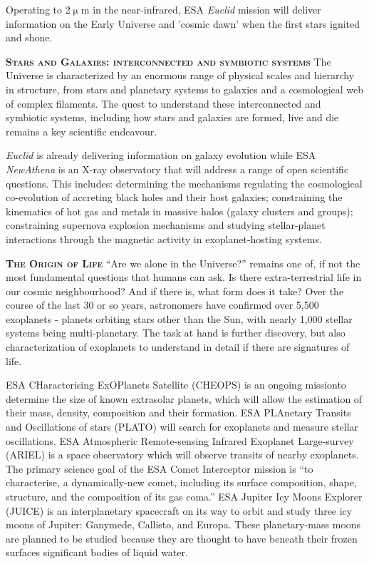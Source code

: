 \documentclass[a4paper,12pt]{texMemo}
\begin{document}
\smallskip
\smallskip
Operating to 2$\upmu$m in the near-infrared, ESA \textit{Euclid}
mission will deliver information on the Early Universe and 'cosmic
dawn' when the first stars ignited and shone.


\smallskip
\smallskip
\noindent
{\bfseries \textsc{\textcolor{Cerulean}{Stars and Galaxies: interconnected and symbiotic systems}}}
The Universe is characterized by an enormous range of physical scales and hierarchy in structure, from
stars and planetary systems to galaxies and a cosmological web of complex filaments.
The quest to understand these interconnected and symbiotic systems, including
how stars and galaxies are formed, live and die remains a key scientific endeavour. 

\smallskip
\textit{Euclid} is already delivering information on galaxy evolution
while ESA \textit{NewAthena} is an X-ray observatory that will address
a range of open scientific questions.  This includes: determining the
mechanisms regulating the cosmological co-evolution of accreting black
holes and their host galaxies; constraining the kinematics of hot gas
and metals in massive halos (galaxy clusters and groups); constraining
supernova explosion mechanisms and studying stellar-planet
interactions through the magnetic activity in exoplanet-hosting
systems.


\smallskip
\smallskip
\noindent
{\bfseries \textsc{\textcolor{Cerulean}{The Origin of Life}}}
``Are we alone in the Universe?'' remains one of, if not the most fundamental
questions that humans can ask. Is there
extra-terrestrial life in our cosmic neighbourhood? And if there is,
what form does it take?  Over the course of the last 30 or so years,
astronomers have confirmed over 5,500 exoplanets - planets orbiting
stars other than the Sun, with nearly 1,000 stellar systems being
multi-planetary.  The task at hand is further discovery, but also
characterization of exoplanets to understand in detail if there are
signatures of life.

\smallskip
ESA CHaracterising ExOPlanets Satellite (CHEOPS) is an ongoing missionto determine the size of known extrasolar planets, which will allow the estimation of their mass, density, composition and their formation. 
ESA PLAnetary Transits and Oscillations of stars (PLATO) will search
for exoplanets and measure stellar oscillations.  ESA Atmospheric
Remote-sensing Infrared Exoplanet Large-survey (ARIEL) is a space
observatory which will observe transits of nearby exoplanets.  The
primary science goal of the ESA Comet Interceptor mission is ``to
characterise, a dynamically-new comet, including its surface
composition, shape, structure, and the composition of its gas coma.''
ESA  Jupiter Icy Moons Explorer (JUICE) is an interplanetary spacecraft on its way to orbit and study three icy moons of Jupiter: Ganymede, Callisto, and Europa. These planetary-mass moons are planned to be studied because they are thought to have beneath their frozen surfaces significant bodies of liquid water. 
\end{document}
